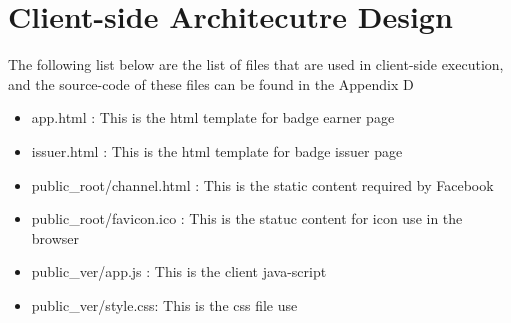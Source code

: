 \section{Client-side Architecutre Design}
The following list below are the list of files that are used in client-side execution, and the source-code of these files can be found in the Appendix D

\begin{itemize}
\item app.html : This is the html template for badge earner page
\item issuer.html : This is the html template for badge issuer page
\item public{\_}root/channel.html : This is the static content required by Facebook 
\item public{\_}root/favicon.ico : This is the statuc content for icon use in the browser
\item public{\_}ver/app.js : This is the client java-script  
\item public{\_}ver/style.css: This is the css file use
\end{itemize}



